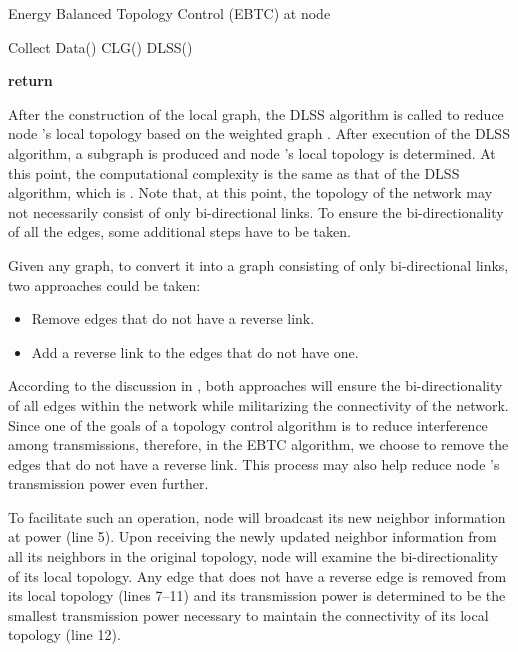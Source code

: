 \documentclass[journal,12pt,onecolumn]{IEEEtran}
\begin{document}
\begin{algorithm}[!t]
\caption{Energy Balanced Topology Control (EBTC) at node
}\label{alg:top}
\begin{algorithmic}[1]
\State Collect Data()
\State CLG()
\State  DLSS()
\State{}
\For {}
\If {}
\EndIf
\EndFor
\State{}
\Statex

\EndFunction
\Statex

\State{, ,  }
\For{}
\State{, }
\For{}
\State{, }
\If{}
\State{}
\EndIf
\EndFor
\EndFor
\State\textbf{return} 
\EndFunction{}
\end{algorithmic}
\end{algorithm}

After the construction of the local graph, the DLSS algorithm is
called to reduce node 's local topology based on the weighted
graph . After execution of the DLSS algorithm, a subgraph is
produced and node 's local topology is determined. At this point,
the computational complexity is the same as that of the DLSS
algorithm, which is . Note that, at this
point, the topology of the network may not necessarily consist of only
bi-directional links. To ensure the bi-directionality of all the
edges, some additional steps have to be taken.

Given any graph, to convert it into a graph consisting of only
bi-directional links, two approaches could be taken:
\begin{itemize}
\item Remove edges that do not have a reverse link.
\item Add a reverse link to the edges that do not have one.
\end{itemize}
According to the discussion in \cite{LiHou2005-1313}, both approaches
will ensure the bi-directionality of all edges within the
network while militarizing the connectivity of the network. Since one of the goals of a topology control algorithm is to
reduce interference among transmissions, therefore, in the EBTC
algorithm, we choose to remove the edges that do not have a reverse
link. This process may also help reduce node 's transmission
power even further.

To facilitate such an operation, node  will broadcast
its new neighbor information  at power  (line 5). Upon
receiving the newly updated neighbor information from all its
neighbors in the original topology, node  will examine the
bi-directionality of its local topology. Any edge that does not have
a reverse edge is removed from its local topology (lines 7--11) and its
transmission power is determined to be the smallest transmission
power necessary to maintain the connectivity of its local topology
(line 12).
\end{document}
